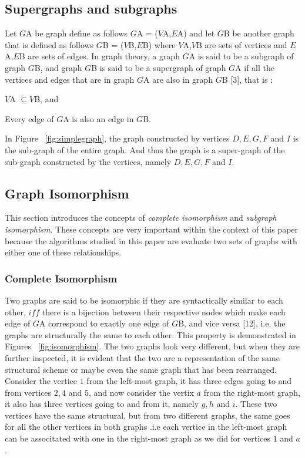 \subsection{Supergraphs and subgraphs}
Let $G${\tiny A} be graph define as follows $G${\tiny A} = ($V${\tiny A},$E${\tiny A}) and let $G${\tiny B} be another graph that is defined as 
follows $G${\tiny B} = ($V${\tiny B},$E${\tiny B}) where $V${\tiny A},$V${\tiny B} are sets of vertices and $E${\tiny A},$E${\tiny B} are sets of edges.
In graph theory, a graph $G${\tiny A} is said to be a subgraph of graph $G${\tiny B}, and graph $G${\tiny B} is said to be a supergraph of graph 
$G${\tiny A} if all the vertices and edges that are in graph $G${\tiny A} are also in graph $G${\tiny B} [3], that is :

\begin{myEnumerate}
  \item $V${\tiny A} $ \subseteq V${\tiny B}, and
  \item Every edge of $G${\tiny A} is also an edge in $G${\tiny B}.
\end{myEnumerate}

In Figure  ~\ref{fig:simplegraph}, the graph constructed by vertices $D,E,G,F$ and $I$ is the sub-graph of the entire graph. And thus the graph is a super-graph of the sub-graph constructed by the vertices, namely $D,E,G,F$ and $I$.

\subsection{Graph Isomorphism}
This section introduces the concepts of \textit{complete isomorphism} and \textit{subgraph isomorphism}. These concepts are very important within the context 
of this paper because the algorithms studied in this paper are evaluate two sets of graphs with either one of these relationships.
\subsubsection{Complete Isomorphism}
Two graphs are said to be isomorphic if they are syntactically similar to each other, $iff$ there is a bijection between their respective nodes which 
make each edge of $G${\tiny A} correspond to exactly one edge of $G${\tiny B}, and vice versa [12], i.e. the graphs are structurally the same to each
other. This property is demonstrated in Figures ~\ref{fig:isomorphism}. 
The two graphs look very different, but when they are further inspected, it is evident that the two are a representation of the same structural scheme or maybe even the same graph that has been rearranged. \newline\newline Consider the vertice $1$ from the left-most graph, it has three edges going to and from vertices $2,4$ and $5$, and now consider the vertix $a$ from the right-most graph, it also has three vertices going to and from it, namely $g,h$ and $i$. These two vertices have the same structural, but from two different graphs, the same goes for all the other vertices in both graphs .i.e each vertice in the left-most graph can be associtated with one in the right-most graph as we did for vertices $1$ and $a$.

